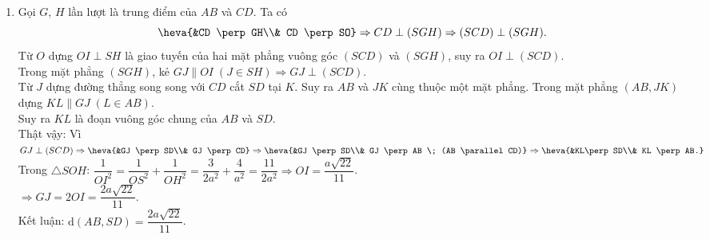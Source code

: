 \begin{bt}
{\begin{enumerate}
{
			}Trong $\triangle SOC$ vuông tại $O$ có: $SC=\sqrt{SO^2+OC^2}=\dfrac{2a\sqrt{3}}{3}.$ $$OM \cdot SC = OS \cdot OC \Leftrightarrow OM \cdot \dfrac{2a\sqrt{3}}{3} = \dfrac{a\sqrt{6}}{3} \cdot \dfrac{a\sqrt{6}}{3} \Rightarrow OM = \dfrac{a\sqrt{3}}{3}.$$
			\item 	Gọi $G$, $H$ lần lượt là trung điểm của $AB$ và $CD$. Ta có $$\heva{&CD \perp GH\\& CD \perp SO} \Rightarrow CD \perp (SGH) \Rightarrow (SCD) \perp (SGH).$$
			Từ $O$ dựng $OI \perp SH$ là giao tuyến của hai mặt phẳng vuông góc $(SCD)$ và $(SGH)$, suy ra $OI \perp (SCD)$.\\
			Trong mặt phẳng $(SGH)$, kẻ $GJ \parallel OI \; (J \in SH) \Rightarrow GJ \perp (SCD)$.\\
			Từ $J$ dựng đường thẳng song song với $CD$ cắt $SD$ tại $K$. Suy ra $AB$ và $JK$ cùng thuộc một mặt phẳng. Trong mặt phẳng $\left( AB, JK \right)$ dựng $KL \parallel GJ \; (L \in AB)$.\\
			Suy ra $KL$ là đoạn vuông góc chung của $AB$ và $SD$.\\
			Thật vậy: Vì $GJ \perp (SCD) \Rightarrow \heva{&GJ \perp SD\\& GJ \perp CD} \Rightarrow \heva{&GJ \perp SD\\& GJ \perp AB \; (AB \parallel CD)} \Rightarrow \heva{&KL\perp SD\\& KL \perp AB.}$\\
			Trong $\triangle SOH$: $\dfrac{1}{OI^2}=\dfrac{1}{OS^2} + \dfrac{1}{OH^2} = \dfrac{3}{2a^2}+\dfrac{4}{a^2}=\dfrac{11}{2a^2} \Rightarrow OI = \dfrac{a \sqrt{22}}{11}$.\\
			$\Rightarrow GJ = 2OI = \dfrac{2 a \sqrt{22}}{11}$.\\
			Kết luận: $\mathrm{d}(AB,SD)=\dfrac{2a\sqrt{22}}{11}$.
		\end{enumerate}
	}
\end{bt}
